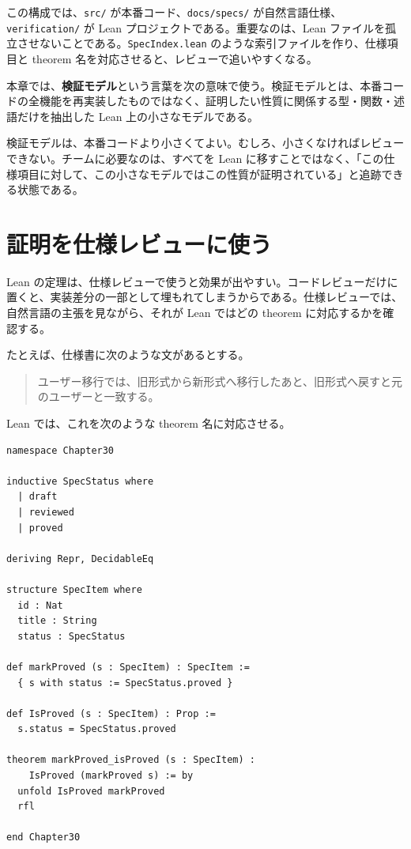 この構成では、\texttt{src/} が本番コード、\texttt{docs/specs/} が自然言語仕様、\texttt{verification/} が Lean プロジェクトである。重要なのは、Lean ファイルを孤立させないことである。\texttt{SpecIndex.lean} のような索引ファイルを作り、仕様項目と theorem 名を対応させると、レビューで追いやすくなる。

\begin{definitionbox}
本章では、\textbf{検証モデル}という言葉を次の意味で使う。検証モデルとは、本番コードの全機能を再実装したものではなく、証明したい性質に関係する型・関数・述語だけを抽出した Lean 上の小さなモデルである。
\end{definitionbox}

検証モデルは、本番コードより小さくてよい。むしろ、小さくなければレビューできない。チームに必要なのは、すべてを Lean に移すことではなく、「この仕様項目に対して、この小さなモデルではこの性質が証明されている」と追跡できる状態である。

\section{証明を仕様レビューに使う}

Lean の定理は、仕様レビューで使うと効果が出やすい。コードレビューだけに置くと、実装差分の一部として埋もれてしまうからである。仕様レビューでは、自然言語の主張を見ながら、それが Lean ではどの theorem に対応するかを確認する。

たとえば、仕様書に次のような文があるとする。

\begin{quote}
ユーザー移行では、旧形式から新形式へ移行したあと、旧形式へ戻すと元のユーザーと一致する。
\end{quote}

Lean では、これを次のような theorem 名に対応させる。

\begin{listing}[htbp]
\begin{verbatim}
namespace Chapter30

inductive SpecStatus where
  | draft
  | reviewed
  | proved

deriving Repr, DecidableEq

structure SpecItem where
  id : Nat
  title : String
  status : SpecStatus

def markProved (s : SpecItem) : SpecItem :=
  { s with status := SpecStatus.proved }

def IsProved (s : SpecItem) : Prop :=
  s.status = SpecStatus.proved

theorem markProved_isProved (s : SpecItem) :
    IsProved (markProved s) := by
  unfold IsProved markProved
  rfl

end Chapter30
\end{verbatim}
\caption{仕様項目と theorem 名を対応させる小さなモデル}
\label{lst:ch30-spec-link}
\end{listing}

